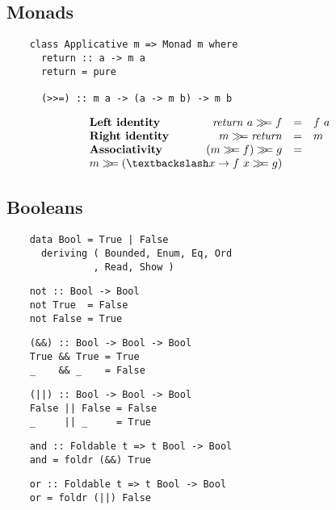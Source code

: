 \begin{multicols}{2}
	\subsection*{Monads}
	
	\begin{verbatim}
	class Applicative m => Monad m where 
	  return :: a -> m a
	  return = pure
	
	  (>>=) :: m a -> (a -> m b) -> m b
	\end{verbatim}
	
	\begin{displaymath}
	\begin{array}{lrcl}
	\textbf{Left identity} & \mathit{return}~a \bind f & = & f~a \\
	\textbf{Right identity} & m \bind \mathit{return} & = & m \\
	\textbf{Associativity} & (m \bind f) \bind g & = & \\ \multicolumn{2}{r}{ m \bind (\textbackslash x \to f~x \bind g)}
	\end{array}
	\end{displaymath}
	
	\subsection*{Booleans}
	
	\begin{verbatim}
	data Bool = True | False
	  deriving ( Bounded, Enum, Eq, Ord
	           , Read, Show )
	\end{verbatim}
	
	\begin{verbatim}
	not :: Bool -> Bool
	not True  = False
	not False = True
	\end{verbatim}
	
	\begin{verbatim}
	(&&) :: Bool -> Bool -> Bool
	True && True = True 
	_    && _    = False
	\end{verbatim}
	
	\begin{verbatim}
	(||) :: Bool -> Bool -> Bool
	False || False = False 
	_     || _     = True
	\end{verbatim}
	
	\begin{verbatim}
	and :: Foldable t => t Bool -> Bool 
	and = foldr (&&) True
	\end{verbatim}
	
	\begin{verbatim}
	or :: Foldable t => t Bool -> Bool 
	or = foldr (||) False
	\end{verbatim}
	

\end{multicols}
